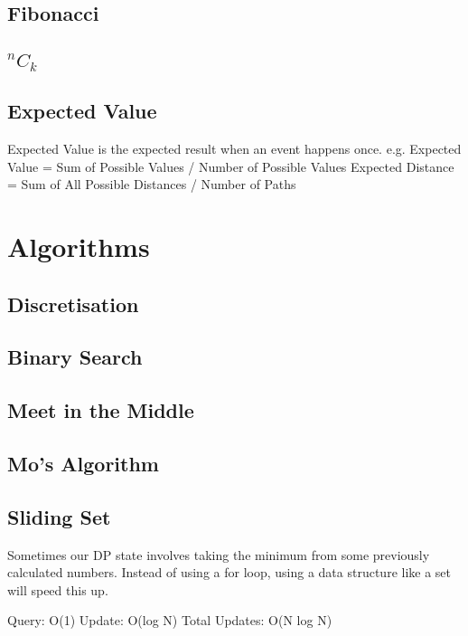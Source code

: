 \documentclass{article}
\begin{document}
\subsection{Fibonacci}

\subsection{\texorpdfstring{$^{n}C_{k}$}{}}


\subsection{Expected Value}
\begin{flushleft}
Expected Value is the expected result when an event happens once. e.g.
\newline
Expected Value = Sum of Possible Values / Number of Possible Values
\newline
Expected Distance = Sum of All Possible Distances / Number of Paths
\end{flushleft}

\section{Algorithms}
\subsection{Discretisation}


\subsection{Binary Search}


\subsection{Meet in the Middle}


\subsection{Mo's Algorithm}


\subsection{Sliding Set}
\begin{flushleft}
Sometimes our DP state involves taking the minimum from some previously
calculated numbers. Instead of using a for loop, using a data structure like a
set will speed this up.

Query: O(1)
Update: O(log N)
Total Updates: O(N log N)
\end{flushleft}

\end{document}
